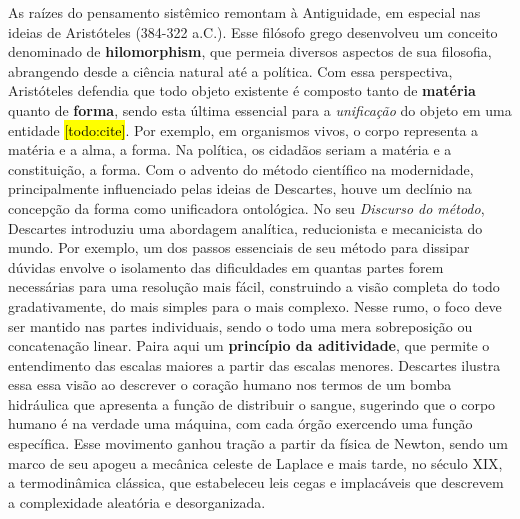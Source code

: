 \documentclass[./main.tex]{subfiles}
\begin{document}
\par As raízes do pensamento sistêmico remontam à Antiguidade, em especial nas ideias de Aristóteles (384-322 a.C.). Esse filósofo grego desenvolveu um conceito denominado de \textbf{\gls{hilomorphism}}, que permeia diversos aspectos de sua filosofia, abrangendo desde a ciência natural até a política. Com essa perspectiva, Aristóteles defendia que todo objeto existente é composto tanto de \textbf{matéria} quanto de \textbf{forma}, sendo esta última essencial para a \textit{unificação} do objeto em uma entidade \hl{[todo:cite]}. Por exemplo, em organismos vivos, o corpo representa a matéria e a alma, a forma. Na política, os cidadãos seriam a matéria e a constituição, a forma. Com o advento do método científico na modernidade, principalmente influenciado pelas ideias de Descartes, houve um declínio na concepção da forma como unificadora ontológica. No seu \textit{Discurso do método}, Descartes introduziu uma abordagem analítica, reducionista e mecanicista do mundo. Por exemplo, um dos passos essenciais de seu método para dissipar dúvidas envolve o isolamento das dificuldades em quantas partes forem necessárias para uma resolução mais fácil, construindo a visão completa do todo gradativamente, do mais simples para o mais complexo. Nesse rumo, o foco deve ser mantido nas partes individuais, sendo o todo uma mera sobreposição ou concatenação linear. Paira aqui um \textbf{princípio da aditividade}, que permite o entendimento das escalas maiores a partir das escalas menores. Descartes ilustra essa essa visão ao descrever o coração humano nos termos de um bomba hidráulica que apresenta a função de distribuir o sangue, sugerindo que o corpo humano é na verdade uma máquina, com cada órgão exercendo uma função específica. Esse movimento ganhou tração a partir da física de Newton, sendo um marco de seu apogeu a mecânica celeste de Laplace e mais tarde, no século XIX, a termodinâmica clássica, que estabeleceu leis cegas e implacáveis que descrevem a complexidade aleatória e desorganizada.
\end{document}
